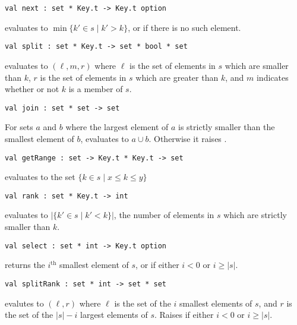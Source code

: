 \begin{gram}[next]
\begin{verbatim}
val next : set * Key.t -> Key.t option
\end{verbatim}
 evaluates to $\min \{ k' \in s \mathbin| k' > k \}$, or
 if there is no such element.
\end{gram}

\begin{gram}[split]
\begin{verbatim}
val split : set * Key.t -> set * bool * set
\end{verbatim}
 evaluates to $(\ell, m, r)$ where $\ell$ is the set of elements
in $s$ which are smaller than $k$, $r$ is the set of elements in $s$ which
are greater than $k$, and $m$ indicates whether or not $k$ is a member of $s$.
\end{gram}

\begin{gram}[join]
\begin{verbatim}
val join : set * set -> set
\end{verbatim}
For sets $a$ and $b$ where the largest element of $a$ is strictly smaller than
the smallest element of $b$,  evaluates to $a \cup b$.
Otherwise it raises .
\end{gram}

\begin{gram}[getRange]
\begin{verbatim}
val getRange : set -> Key.t * Key.t -> set
\end{verbatim}
 evaluates to the set
$\{ k \in s \mathbin| x \leq k \leq y \}$
\end{gram}

\begin{gram}[rank]
\begin{verbatim}
val rank : set * Key.t -> int
\end{verbatim}
 evaluates to $\left| \{ k' \in s \mathbin| k' < k \}\right|$,
the number of elements in $s$ which are strictly smaller than $k$.
\end{gram}

\begin{gram}[select]
\begin{verbatim}
val select : set * int -> Key.t option
\end{verbatim}
 returns the $i^\text{th}$ smallest element of $s$, or
 if either $i < 0$ or $i \geq |s|$.
\end{gram}

\begin{gram}[splitRank]
\begin{verbatim}
val splitRank : set * int -> set * set
\end{verbatim}
 evalutes to $(\ell,r)$ where $\ell$ is the set of the
$i$ smallest elements of $s$, and $r$ is the set of the $|s|-i$ largest
elements of $s$. Raises  if either $i < 0$ or $i \geq |s|$.
\end{gram}


